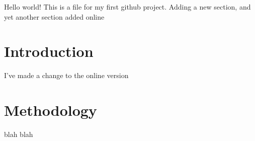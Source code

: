 \documentclass{article}
\begin{document}
Hello world! This is a file for my first github project. Adding a new section, and yet another section added online
\section{Introduction}

I've made a change to the online version

\section{Methodology}

blah blah
\end{document}
